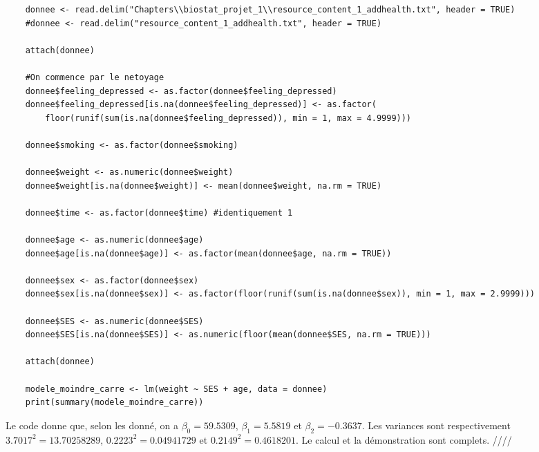 \documentclass[../main.tex]{subfiles}
\begin{document}
\begin{CJK*}{UTF8}{gbsn}
\begin{lstlisting}
    donnee <- read.delim("Chapters\\biostat_projet_1\\resource_content_1_addhealth.txt", header = TRUE)
    #donnee <- read.delim("resource_content_1_addhealth.txt", header = TRUE)
    
    attach(donnee)
    
    #On commence par le netoyage
    donnee$feeling_depressed <- as.factor(donnee$feeling_depressed)
    donnee$feeling_depressed[is.na(donnee$feeling_depressed)] <- as.factor(
        floor(runif(sum(is.na(donnee$feeling_depressed)), min = 1, max = 4.9999)))
    
    donnee$smoking <- as.factor(donnee$smoking)
    
    donnee$weight <- as.numeric(donnee$weight)
    donnee$weight[is.na(donnee$weight)] <- mean(donnee$weight, na.rm = TRUE)
    
    donnee$time <- as.factor(donnee$time) #identiquement 1
    
    donnee$age <- as.numeric(donnee$age)
    donnee$age[is.na(donnee$age)] <- as.factor(mean(donnee$age, na.rm = TRUE))
    
    donnee$sex <- as.factor(donnee$sex)
    donnee$sex[is.na(donnee$sex)] <- as.factor(floor(runif(sum(is.na(donnee$sex)), min = 1, max = 2.9999)))
    
    donnee$SES <- as.numeric(donnee$SES)
    donnee$SES[is.na(donnee$SES)] <- as.numeric(floor(mean(donnee$SES, na.rm = TRUE)))
    
    attach(donnee)
    
    modele_moindre_carre <- lm(weight ~ SES + age, data = donnee)
    print(summary(modele_moindre_carre))
\end{lstlisting}

Le code donne que, selon les donné, on a $\beta_0 = 59.5309$, $\beta_1 = 5.5819$ et $\beta_2 = -0.3637$.
Les variances sont respectivement $3.7017^2 = 13.70258289 $, $0.2223^2 = 0.04941729$ et $0.2149^2 = 0.4618201$.
Le calcul et la démonstration sont complets. ////
\end{CJK*}
\end{document}
